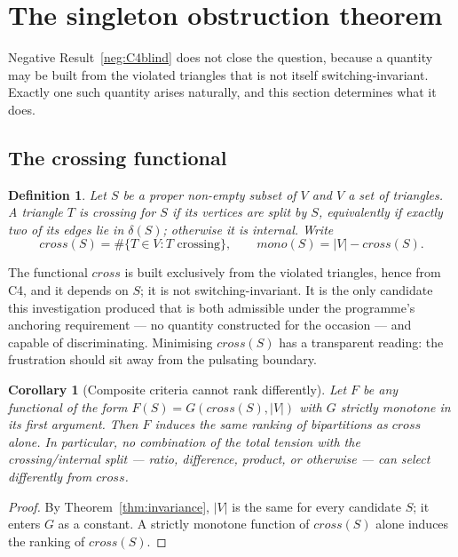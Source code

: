\documentclass[11pt,a4paper]{article}
\def\mathrm#1{#1}%
\def\mathcal#1{#1}%
\newtheorem{corollary}[theorem]{Corollary}
\newtheorem{definition}[theorem]{Definition}
\newcommand{\cross}{\mathrm{cross}}
\newcommand{\mono}{\mathrm{mono}}
\begin{document}
\section{The singleton obstruction theorem}
\label{sec:obstruction}

Negative Result~\ref{neg:C4blind} does not close the question, because a quantity may be built from the violated triangles that is not itself switching-invariant. Exactly one such quantity arises naturally, and this section determines what it does.

\subsection{The crossing functional}

\begin{definition}
\label{def:cross}
Let $S$ be a proper non-empty subset of $V$ and $\mathcal{V}$ a set of triangles. A triangle $T$ is \emph{crossing} for $S$ if its vertices are split by $S$, equivalently if exactly two of its edges lie in $\delta(S)$; otherwise it is \emph{internal}. Write
\[
\cross(S)=\#\{T\in\mathcal{V}: T \text{ crossing}\},\qquad
\mono(S)=|\mathcal{V}|-\cross(S).
\]
\end{definition}

The functional $\cross$ is built exclusively from the violated triangles, hence from C4, and it depends on $S$; it is not switching-invariant. It is the only candidate this investigation produced that is both admissible under the programme's anchoring requirement --- no quantity constructed for the occasion --- and capable of discriminating. Minimising $\cross(S)$ has a transparent reading: the frustration should sit away from the pulsating boundary.

\begin{corollary}[Composite criteria cannot rank differently]
\label{cor:composite}
Let $F$ be any functional of the form $F(S)=G(\cross(S),|\mathcal{V}|)$ with $G$ strictly monotone in its first argument. Then $F$ induces the same ranking of bipartitions as $\cross$ alone. In particular, no combination of the total tension with the crossing/internal split --- ratio, difference, product, or otherwise --- can select differently from $\cross$.
\end{corollary}

\begin{proof}
By Theorem~\ref{thm:invariance}, $|\mathcal{V}|$ is the same for every candidate $S$; it enters $G$ as a constant. A strictly monotone function of $\cross(S)$ alone induces the ranking of $\cross(S)$.
\end{proof}
\end{document}
